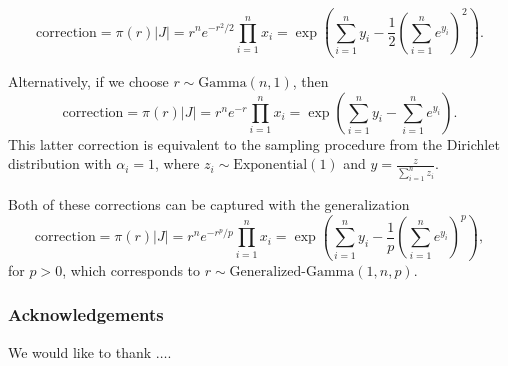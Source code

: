\documentclass[11pt]{article}
\begin{document}
\[
  \mathrm{correction}
  = \pi(r) |J| = r^n e^{-r^2/2} \prod_{i=1}^n x_i
  = \exp\left(\sum_{i=1}^n y_i - \frac{1}{2}\left(\sum_{i=1}^n
      e^{y_i}\right)^2\right).
\]

Alternatively, if we choose $r \sim \mathrm{Gamma}(n, 1)$, then
\[
  \mathrm{correction} = \pi(r) |J| = r^n e^{-r} \prod_{i=1}^n x_i =
  \exp\left(\sum_{i=1}^n y_i - \sum_{i=1}^n e^{y_i}\right).
\]
This latter correction is equivalent to the sampling procedure from
the Dirichlet distribution with $\alpha_i=1$, where
$z_i \sim \mathrm{Exponential}(1)$ and
$y = \frac{z}{\sum_{i=1}^n z_i}$.

Both of these corrections can be captured with the generalization
\[
  \mathrm{correction}
  = \pi(r) |J|
  = r^n e^{-r^p/p} \prod_{i=1}^n x_i
  = \exp\left(\sum_{i=1}^n y_i - \frac{1}{p} \left(\sum_{i=1}^n e^{y_i}\right)^p\right),
\]
for $p > 0$, which corresponds to $r \sim \text{Generalized-Gamma}(1, n, p)$.


\subsubsection*{Acknowledgements}

We would like to thank $\ldots$.




{}

\end{document}
